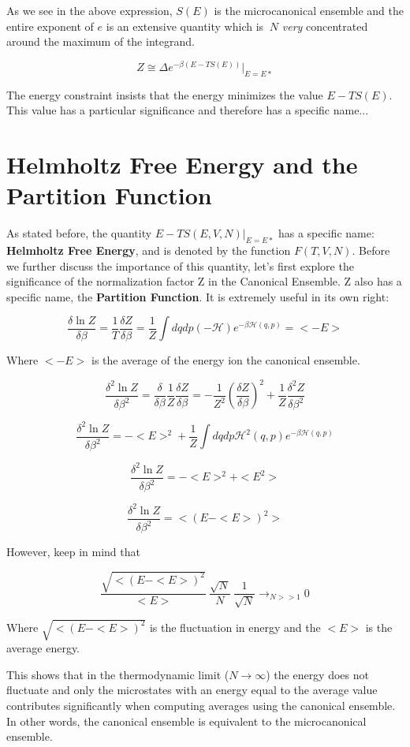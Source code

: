\documentclass{article}
\newcommand{\pardif}[2]{\frac{\delta#1}{\delta#2}}
\newcommand{\secpardif}[2]{\frac{\delta^{2}#1}{\delta#2^{2}}}
\begin{document}
As we see in the above expression, $S(E)$ is the microcanonical ensemble and the entire exponent of $e$ is an extensive quantity which is $~N$ \textit{very} concentrated around the maximum of the integrand.


$$Z\cong\Delta e^{-\beta(E-TS(E))}\vert_{E=E*}$$

The energy constraint insists that the energy minimizes the value $E-TS(E)$.  This value has a particular significance and therefore has a specific name...

\section{Helmholtz Free Energy and the Partition Function}

As stated before, the quantity $E-TS(E,V,N)\vert_{E=E*}$ has a specific name: \textbf{Helmholtz Free Energy}, and is denoted by the function $F(T,V,N)$.  Before we further discuss the importance of this quantity, let's first explore the significance of the normalization factor Z in the Canonical Ensemble.  Z also has a specific name, the \textbf{Partition Function}.  It is extremely useful in its own right:

$$\pardif{\ln{Z}}{\beta}=\frac{1}{T}\pardif{Z}{\beta}=\frac{1}{Z}\int dqdp(-\mathcal{H})e^{-\beta\mathcal{H}(q,p)}=<-E>$$

Where $<-E>$ is the average of the energy ion the canonical ensemble.

$$\secpardif{\ln{Z}}{\beta}=\frac{\delta}{\delta\beta}\frac{1}{Z}\pardif{Z}{\beta}=-\frac{1}{Z^{2}}(\pardif{Z}{\beta})^{2}+\frac{1}{Z}\secpardif{Z}{\beta}$$

$$\secpardif{\ln{Z}}{\beta}=-<E>^{2}+\frac{1}{Z}\int dqdp\mathcal{H}^{2}(q,p)e^{-\beta\mathcal{H}(q,p)}$$

$$\secpardif{\ln{Z}}{\beta}=-<E>^{2}+<E^{2}>$$

$$\secpardif{\ln{Z}}{\beta}=<(E-<E>)^{2}>$$

However, keep in mind that 

$$\frac{\sqrt{<(E-<E>)^{2}}}{<E>}~\frac{\sqrt{N}}{N}~\frac{1}{\sqrt{N}}\rightarrow_{N>>1}0$$

Where $\sqrt{<(E-<E>)^{2}}$ is the fluctuation in energy and the $<E>$ is the average energy.

This shows that in the thermodynamic limit ($N\rightarrow\infty$) the energy does not fluctuate and only the microstates with an energy equal to the average value contributes significantly when computing averages using the canonical ensemble.  In other words, the canonical ensemble is equivalent to the microcanonical ensemble.
\end{document}
